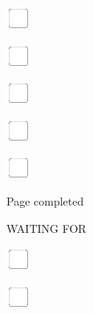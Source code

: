 \documentclass[11pt,titlepage]{article}
\begin{document}
\vspace{10mm}

\noindent
\includegraphics[]{checkbox-4mm.pdf}

\vspace{10mm}

\noindent
\includegraphics[]{checkbox-4mm.pdf}

\vspace{10mm}

\noindent
\includegraphics[]{checkbox-4mm.pdf}

\vspace{10mm}

\noindent
\includegraphics[]{checkbox-4mm.pdf}

\vspace{10mm}

\noindent
\includegraphics[]{checkbox-4mm.pdf}

\vspace{4mm}

\hfill Page completed \hspace{20mm}

\pagebreak

\small
\hfill WAITING FOR

\vspace{6mm}

\noindent
\includegraphics[]{checkbox-4mm.pdf}

\vspace{10mm}

\noindent
\includegraphics[]{checkbox-4mm.pdf}
\end{document}
